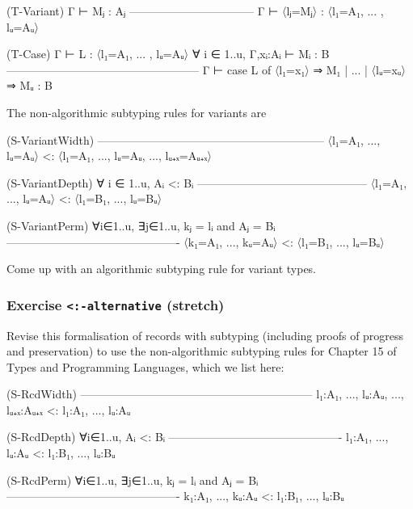 \begin{myDisplay}
(T-Variant)
Γ ⊢ Mⱼ : Aⱼ
---------------------------------
Γ ⊢ 〈lⱼ=Mⱼ〉 : 〈l₁=A₁, ... , lᵤ=Aᵤ〉


(T-Case)
Γ ⊢ L : 〈l₁=A₁, ... , lᵤ=Aᵤ〉
∀ i ∈ 1..u,   Γ,xᵢ:Aᵢ ⊢ Mᵢ : B
---------------------------------------------------
Γ ⊢ case L of 〈l₁=x₁〉 ⇒ M₁ | ... | 〈lᵤ=xᵤ〉 ⇒ Mᵤ  : B
\end{myDisplay}

The non-algorithmic subtyping rules for variants are

\begin{myDisplay}
(S-VariantWidth)
------------------------------------------------------------
〈l₁=A₁, ..., lᵤ=Aᵤ〉   <:   〈l₁=A₁, ..., lᵤ=Aᵤ, ..., lᵤ₊ₓ=Aᵤ₊ₓ〉

(S-VariantDepth)
∀ i ∈ 1..u,    Aᵢ <: Bᵢ
---------------------------------------------
〈l₁=A₁, ..., lᵤ=Aᵤ〉   <:   〈l₁=B₁, ..., lᵤ=Bᵤ〉

(S-VariantPerm)
∀i∈1..u, ∃j∈1..u, kⱼ = lᵢ and Aⱼ = Bᵢ
----------------------------------------------
〈k₁=A₁, ..., kᵤ=Aᵤ〉   <:   〈l₁=B₁, ..., lᵤ=Bᵤ〉
\end{myDisplay}

Come up with an algorithmic subtyping rule for variant types.

\hypertarget{exercise--alternative-stretch}{%
\subsubsection{\texorpdfstring{Exercise
\texttt{\textless{}:-alternative}
(stretch)}{Exercise \textless:-alternative (stretch)}}\label{exercise--alternative-stretch}}

Revise this formalisation of records with subtyping (including proofs of
progress and preservation) to use the non-algorithmic subtyping rules
for Chapter 15 of Types and Programming Languages, which we list here:

\begin{myDisplay}
(S-RcdWidth)
--------------------------------------------------------------
{ l₁:A₁, ..., lᵤ:Aᵤ, ..., lᵤ₊ₓ:Aᵤ₊ₓ } <: { l₁:A₁, ..., lᵤ:Aᵤ }

(S-RcdDepth)
    ∀i∈1..u, Aᵢ <: Bᵢ
----------------------------------------------
{ l₁:A₁, ..., lᵤ:Aᵤ } <: { l₁:B₁, ..., lᵤ:Bᵤ }

(S-RcdPerm)
∀i∈1..u, ∃j∈1..u, kⱼ = lᵢ and Aⱼ = Bᵢ
----------------------------------------------
{ k₁:A₁, ..., kᵤ:Aᵤ } <: { l₁:B₁, ..., lᵤ:Bᵤ }
\end{myDisplay}

